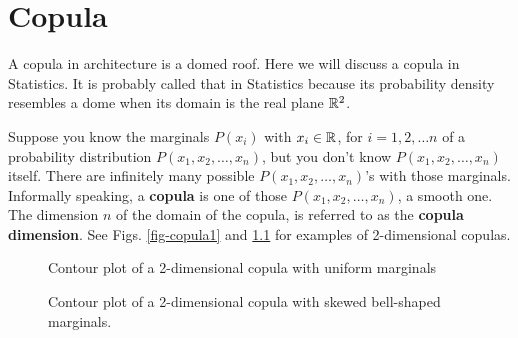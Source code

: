 \chapter{Copula}
\label{ch-copula}

A copula in architecture is a domed roof. Here we will discuss a copula in Statistics.
It is probably called that in Statistics
because its probability density resembles a dome when its domain is 
the real plane ${ \mathbb{R}}^2$.

Suppose you know the marginals $P(x_i)$ with $x_i\in { \mathbb{R}}$, for
$i=1,2, \ldots n$ 
of a probability distribution $P(x_1, x_2, \ldots, x_n)$,
but you don't know $P(x_1, x_2, \ldots, x_n)$
itself. There are
infinitely many
possible $P(x_1, x_2, \ldots, x_n)$'s
with those marginals.
Informally
speaking,
a {\bf copula} is one of those
$P(x_1, x_2, \ldots, x_n)$, a smooth one.
The dimension $n$ of
the domain of the copula,
is referred to as the
{\bf copula dimension}.
See Figs. \ref{fig-copula1}
and \ref{fig-copula2}
for examples of 2-dimensional copulas.

\begin{figure}[!h]
\begin{floatrow}
 {\caption{Contour plot of a 2-dimensional copula
 with uniform marginals}
 \label{fig-copula1}}
 {\caption{Contour plot of a 2-dimensional copula
 with skewed bell-shaped marginals.}
 \label{fig-copula2}}
\end{floatrow}
\end{figure}





